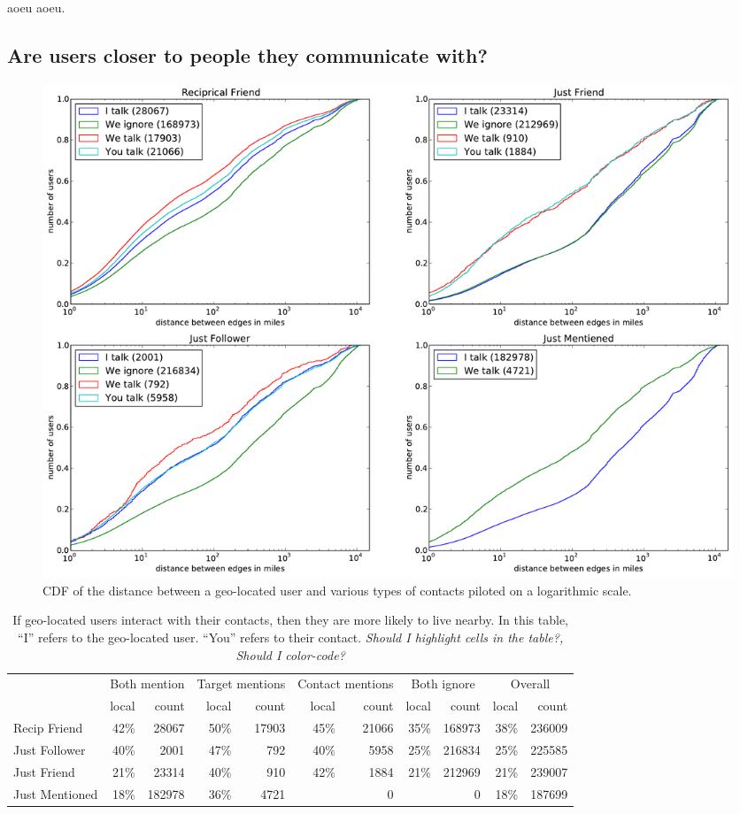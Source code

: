 aoeu aoeu.

\subsection{Are users closer to people they communicate with?}

\ifdefined\THESIS
    \begin{figure}[tb]
    \centering
    \includegraphics[width=\linewidth]{figures/com_types.pdf}
    \caption{
    CDF of the distance between a geo-located user and various types of contacts
    piloted on a logarithmic scale.
    }
    \label{fig:ComTypes}
    \end{figure}
\fi


\begin{table}[tb]
\centering
\begin{tabular}{l | r r | r r | r r | r r | r r}
    & \multicolumn{2}{|c}{Both mention}
    & \multicolumn{2}{|c}{Target mentions}
    & \multicolumn{2}{|c}{Contact mentions}
    & \multicolumn{2}{|c}{Both ignore}
    & \multicolumn{2}{|c}{Overall} \\
    \cline{2-11}
    &local&count&local&count&local&count&local&count&local&count \\
    \hline
    Recip Friend & 42\%&28067 & 50\%&17903 & 45\%&21066 & 35\%&168973 & 38\%&236009 \\
    Just Follower & 40\%&2001 & 47\%&792 & 40\%&5958 & 25\%&216834 & 25\%&225585 \\
    Just Friend & 21\%&23314 & 40\%&910 & 42\%&1884 & 21\%&212969 & 21\%&239007 \\
    Just Mentioned & 18\%&182978 & 36\%&4721 & & 0 & & 0 & 18\%&187699 \\
\end{tabular}
\caption{
If geo-located users interact with their contacts, then they are more likely to
live nearby.
%
In this table, ``I'' refers to the geo-located user. ``You'' refers to their
contact.
%
\emph{Should I highlight cells in the table?, Should I color-code?}
}
\label{tab:ComTypes}
\end{table}


